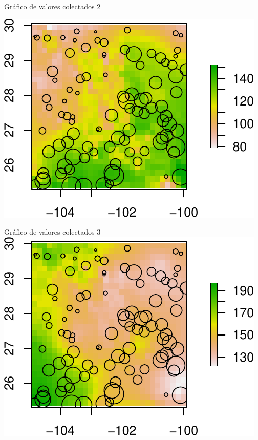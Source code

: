 \documentclass[
  11pt,
  ignorenonframetext,
]{beamer}
\newenvironment{Shaded}{}{}
\newcommand{\AttributeTok}[1]{\textcolor[rgb]{0.49,0.56,0.16}{#1}}
\newcommand{\DecValTok}[1]{\textcolor[rgb]{0.25,0.63,0.44}{#1}}
\newcommand{\FunctionTok}[1]{\textcolor[rgb]{0.02,0.16,0.49}{#1}}
\newcommand{\NormalTok}[1]{#1}
\newcommand{\SpecialCharTok}[1]{\textcolor[rgb]{0.25,0.44,0.63}{#1}}
\newcommand{\StringTok}[1]{\textcolor[rgb]{0.25,0.44,0.63}{#1}}
\begin{document}
\begin{frame}[fragile]{Gráfico de valores colectados 2}
\protect\hypertarget{gruxe1fico-de-valores-colectados-2}{}
\begin{Shaded}
\end{Shaded}

\includegraphics{Correlacion-espacial_files/figure-beamer/unnamed-chunk-9-1.pdf}
\end{frame}

\begin{frame}{Gráfico de valores colectados 3}
\protect\hypertarget{gruxe1fico-de-valores-colectados-3}{}
\includegraphics{Correlacion-espacial_files/figure-beamer/unnamed-chunk-10-1.pdf}
\end{frame}
\end{document}
